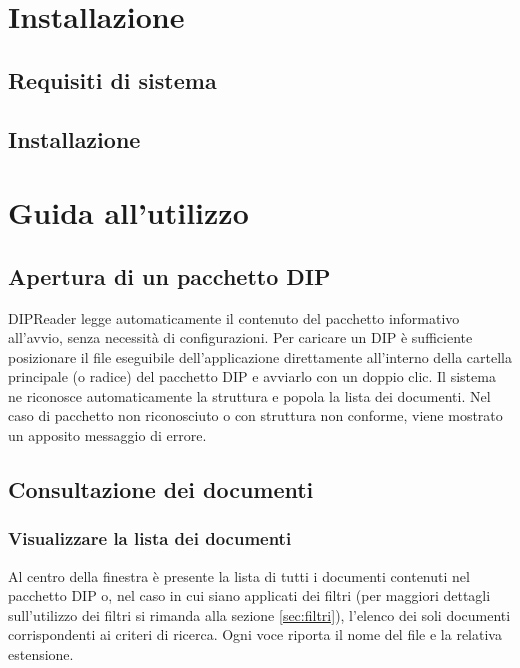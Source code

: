 \documentclass[a4paper,12pt]{article}
\begin{document}
    \section{Installazione}
        \subsection{Requisiti di sistema}

        \subsection{Installazione}
            
    \section{Guida all'utilizzo}
        \subsection{Apertura di un pacchetto DIP}
        \label{sec:apertura}
        DIPReader legge automaticamente il contenuto del pacchetto informativo all'avvio, senza necessità di configurazioni. Per caricare un DIP è sufficiente posizionare il file eseguibile dell'applicazione direttamente all'interno della cartella principale (o radice) del pacchetto DIP e avviarlo con un doppio clic.
        Il sistema ne riconosce automaticamente la struttura e popola la lista dei documenti. Nel caso di pacchetto non riconosciuto o con struttura non conforme, viene mostrato un apposito messaggio di errore.

        \subsection{Consultazione dei documenti}
            \subsubsection{Visualizzare la lista dei documenti}
            Al centro della finestra è presente la lista di tutti i documenti contenuti nel pacchetto DIP o, nel caso in cui siano applicati dei filtri (per maggiori dettagli sull'utilizzo dei filtri si rimanda alla sezione \ref{sec:filtri}), l'elenco dei soli documenti corrispondenti ai criteri di ricerca. Ogni voce riporta il nome del file e la relativa estensione.          
            
\end{document}
